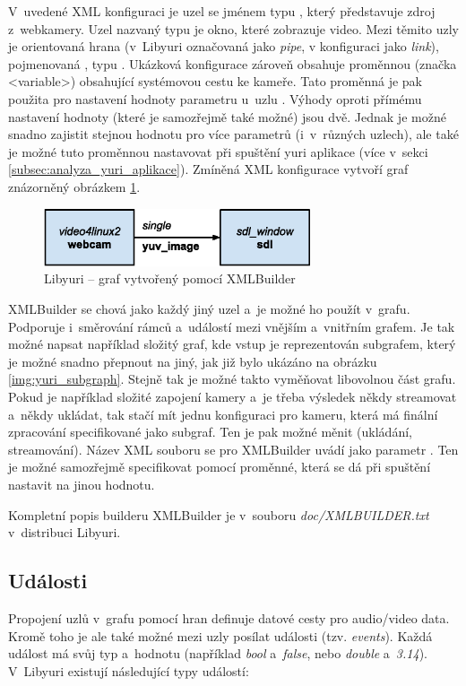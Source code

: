 \documentclass[thesis=M,czech]{FITthesis}[2012/06/26]
\begin{document}
	V~uvedené XML konfiguraci je uzel se jménem  typu , který představuje zdroj z~webkamery. Uzel nazvaný  typu  je okno, které zobrazuje video. Mezi těmito uzly je orientovaná hrana (v~Libyuri označovaná jako \textit{pipe}, v konfiguraci jako \textit{link}), pojmenovaná , typu . Ukázková konfigurace zároveň obsahuje proměnnou (značka <variable>) obsahující systémovou cestu ke kameře. Tato proměnná je pak použita pro nastavení hodnoty parametru  u~uzlu . Výhody oproti přímému nastavení hodnoty (které je samozřejmě také možné) jsou dvě. Jednak je možné snadno zajistit stejnou hodnotu pro více parametrů (i~v~různých uzlech), ale také je možné tuto proměnnou nastavovat při spuštění yuri aplikace (více v~sekci \ref{subsec:analyza_yuri_aplikace}). Zmíněná XML konfigurace vytvoří graf znázorněný obrázkem \ref{img:yuri_vytvoreni_xml}.\\

\begin{figure}[h]\centering
	\includegraphics[width=0.7\textwidth]{images/yuri_xml_graph.eps}
	\caption{Libyuri -- graf vytvořený pomocí XMLBuilder}\label{img:yuri_vytvoreni_xml}
\end{figure}

XMLBuilder se chová jako každý jiný uzel a~je možné ho použít v~grafu. Podporuje i~směrování rámců a~událostí mezi vnějším a~vnitřním grafem. Je tak možné napsat například složitý graf, kde vstup je reprezentován subgrafem, který je možné snadno přepnout na jiný, jak již bylo ukázáno na obrázku \ref{img:yuri_subgraph}. Stejně tak je možné takto vyměňovat libovolnou část grafu. Pokud je například složité zapojení kamery a~je třeba výsledek někdy streamovat a~někdy ukládat, tak stačí mít jednu konfiguraci pro kameru, která má finální zpracování specifikované jako subgraf. Ten je pak možné měnit (ukládání, streamování). 
Název XML souboru se pro XMLBuilder uvádí jako parametr . Ten je možné samozřejmě specifikovat pomocí proměnné, která se dá při spuštění nastavit na jinou hodnotu. 

Kompletní popis builderu XMLBuilder je v~souboru \textit{doc/XMLBUILDER.txt} v~distribuci Libyuri.

\subsection{Události} \label{subsec:analyza_yuri_udalosti}
Propojení uzlů v~grafu pomocí hran definuje datové cesty pro audio/video data. Kromě toho je ale také možné mezi uzly posílat události (tzv. \textit{events}). Každá událost má svůj typ a~hodnotu (například \textit{bool} a~\textit{false}, nebo \textit{double} a~\textit{3.14}). V~Libyuri existují následující typy událostí:
\end{document}
